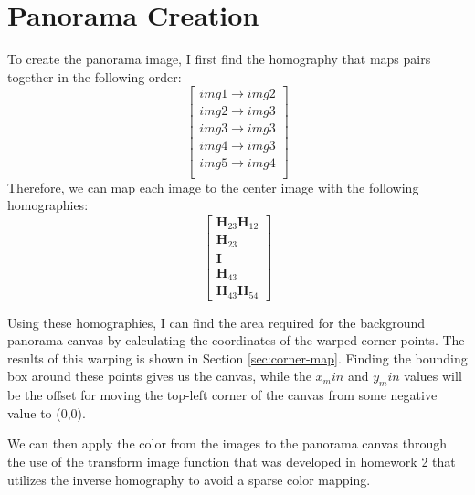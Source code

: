 \documentclass{article}
\begin{document}
\section{Panorama Creation}
To create the panorama image, I first find the homography that maps pairs together in the following order: 
\[\begin{bmatrix}
    img1 \rightarrow img2 \\
    img2 \rightarrow img3 \\
    img3 \rightarrow img3 \\
    img4 \rightarrow img3 \\
    img5 \rightarrow img4 \\
\end{bmatrix}\]
Therefore, we can map each image to the center image with the following homographies:
\[\begin{bmatrix}
    \boldsymbol{H}_{23} \boldsymbol{H}_{12} \\
    \boldsymbol{H}_{23} \\
    \boldsymbol{I} \\
    \boldsymbol{H}_{43} \\
    \boldsymbol{H}_{43} \boldsymbol{H}_{54}
\end{bmatrix}\]

Using these homographies, I can find the area required for the background panorama canvas by calculating the coordinates of the warped corner points. The results of this warping is shown in Section \ref{sec:corner-map}. Finding the bounding box around these points gives us the canvas, while the $x_min$ and $y_min$ values will be the offset for moving the top-left corner of the canvas from some negative value to (0,0).

We can then apply the color from the images to the panorama canvas through the use of the transform image function that was developed in homework 2 that utilizes the inverse homography to avoid a sparse color mapping.
\end{document}
